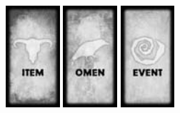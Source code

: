 \begin{titlepage}

\begin{center}


\hspace{2cm}
\vspace{2cm}
\begin{figure}[h!]
    \begin{minipage}[t]{0.4\textwidth}\vspace{0pt}
        \centering
        \includegraphics[width=2cm]{resources/item2}
    \end{minipage}\hfill%
    \begin{minipage}[t]{0.2\textwidth}\vspace{0pt}
        \centering
        \includegraphics[width=2cm]{resources/omen2}
    \end{minipage}\hfill%
    \begin{minipage}[t]{0.4\textwidth}\vspace{0pt}
        \centering
        \includegraphics[width=2cm]{resources/event2}
    \end{minipage}\hfill%
\end{figure}

\vspace{1.5cm}


\end{center}
\end{titlepage}

